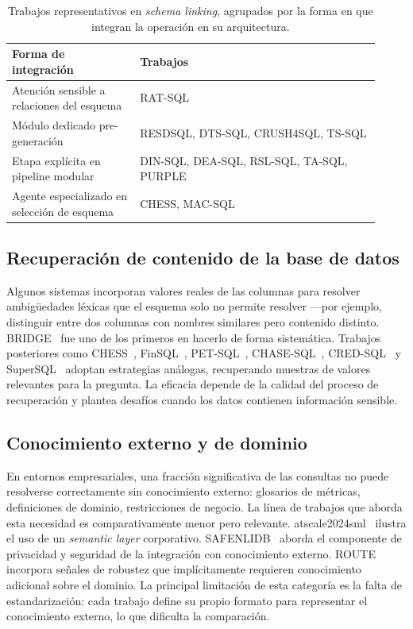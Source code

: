 \begin{table}[!htbp]
\centering
\footnotesize
\caption{Trabajos representativos en \emph{schema linking}, agrupados por la forma en que integran la operación en su arquitectura.}
\label{tab:sota-d4-schemalinking}
\begin{tabular}{@{}p{0.32\linewidth}p{0.60\linewidth}@{}}
\toprule
\textbf{Forma de integración} & \textbf{Trabajos} \\
\midrule
Atención sensible a relaciones del esquema & RAT-SQL \\
Módulo dedicado pre-generación & RESDSQL, DTS-SQL, CRUSH4SQL, TS-SQL \\
Etapa explícita en pipeline modular & DIN-SQL, DEA-SQL, RSL-SQL, TA-SQL, PURPLE \\
Agente especializado en selección de esquema & CHESS, MAC-SQL \\
\bottomrule
\end{tabular}
\end{table}

\subsection{Recuperación de contenido de la base de datos}
\label{subsec:sota-d4-content}

Algunos sistemas incorporan valores reales de las columnas para resolver
ambigüedades léxicas que el esquema solo no permite resolver
---por ejemplo, distinguir entre dos columnas con nombres similares pero
contenido distinto. BRIDGE~\cite{BRIDGE2020} fue uno de los primeros en
hacerlo de forma sistemática. Trabajos posteriores como
CHESS~\cite{CHESS2024}, FinSQL~\cite{FinSQL2024},
PET-SQL~\cite{PET-SQL2024}, CHASE-SQL~\cite{CHASE-SQL2025},
CRED-SQL~\cite{CRED-SQL2025} y SuperSQL~\cite{SuperSQL2024} adoptan
estrategias análogas, recuperando muestras de valores relevantes para la
pregunta. La eficacia depende de la calidad del proceso de recuperación
y plantea desafíos cuando los datos contienen información sensible.

\subsection{Conocimiento externo y de dominio}
\label{subsec:sota-d4-external}

En entornos empresariales, una fracción significativa de las consultas
no puede resolverse correctamente sin conocimiento externo: glosarios de
métricas, definiciones de dominio, restricciones de negocio. La línea
de trabajos que aborda esta necesidad es comparativamente menor pero
relevante. atscale2024sml~\cite{atscale2024sml} ilustra el uso de un
\emph{semantic layer} corporativo. SAFENLIDB~\cite{SAFENLIDB} aborda el
componente de privacidad y seguridad de la integración con conocimiento
externo. ROUTE~\cite{ROUTE2025} incorpora señales de robustez que
implícitamente requieren conocimiento adicional sobre el dominio.
La principal limitación de esta categoría es la falta de
estandarización: cada trabajo define su propio formato para representar
el conocimiento externo, lo que dificulta la comparación.

